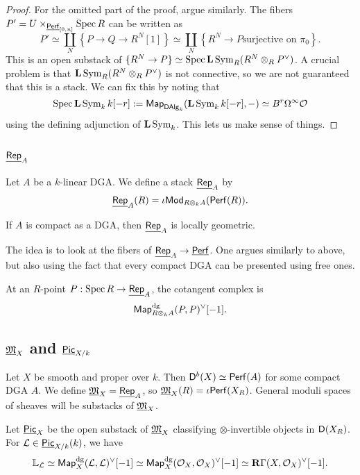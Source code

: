 \documentclass{amsart}
\begin{document}
\begin{proof}
	For the omitted part of the proof, argue similarly.
	The fibers $P' = U \times_{\underline{\mathsf{Perf}}_{[0,n]}} \operatorname{Spec} R$ can be written as
	\[
		P' \simeq \coprod_N \left\{ P \to Q \to R^N[1] \right\} \simeq \coprod_N \left\{ R^N \to P \textrm{surjective on $\pi_0$}\right\}.
	\]
	This is an open substack of $\{ R^N \to P \} \simeq \operatorname{Spec} \mathbf{L} \operatorname{Sym}_R (R^N \otimes_R P^\vee)$.
	A crucial problem is that $\mathbf{L} \operatorname{Sym}_R (R^N \otimes_R P^\vee)$ is not connective, so we are not guaranteed that this is a stack.
	We can fix this by noting that
	\[
		\operatorname{Spec} \mathbf{L} \operatorname{Sym}_k k[-r] := \mathsf{Map}_{\mathsf{DAlg}_k}(\mathbf{L} \operatorname{Sym}_k k[-r], -) \simeq B^r \Omega^\infty \mathcal{O}
	\]
	using the defining adjunction of $\mathbf{L} \operatorname{Sym}_k$.
	This lets us make sense of things.
\end{proof}

\subsection{$\underline{\mathsf{Rep}}_A$}

Let $A$ be a $k$-linear DGA.
We define a stack $\underline{\mathsf{Rep}}_A$ by
\[
	\underline{\mathsf{Rep}}_A(R) = \iota \mathsf{Mod}_{R \otimes_k A}(\mathsf{Perf}(R)).
\]

\begin{thm}[To\"en-Vaqui\'e]
	If $A$ is compact as a DGA, then $\underline{\mathsf{Rep}}_A$ is locally geometric.
\end{thm}

The idea is to look at the fibers of $\underline{\mathsf{Rep}}_A \to \underline{\mathsf{Perf}}$.
One argues similarly to above, but also using the fact that every compact DGA can be presented using free ones.

\begin{lem}
	At an $R$-point $P: \operatorname{Spec} R \to \underline{\mathsf{Rep}}_A$, the cotangent complex is
	\[
		\mathsf{Map}_{R \otimes_k A}^{\textrm{dg}}(P, P)^\vee[-1].
	\]
\end{lem}

\subsection{$\underline{\mathfrak{M}}_X$ and $\underline{\mathsf{Pic}}_{X/k}$}

Let $X$ be smooth and proper over $k$.
Then $\mathsf{D}^b(X) \simeq \mathsf{Perf}(A)$ for some compact DGA $A$.
We define $\underline{\mathfrak{M}}_X = \underline{\mathsf{Rep}}_A$, so $\underline{\mathfrak{M}}_X(R) = \iota \mathsf{Perf}(X_R)$.
General moduli spaces of sheaves will be substacks of $\underline{\mathfrak{M}}_X$.

Let $\underline{\mathsf{Pic}}_X$ be the open substack of $\underline{\mathfrak{M}}_X$ classifying $\otimes$-invertible objects in $\mathsf{D}(X_R)$.
For $\mathcal{L} \in \underline{\mathsf{Pic}}_{X/k}(k)$, we have
\[
	\mathbb{L}_{\mathcal{L}} \simeq \mathsf{Map}_X^{\textrm{dg}}(\mathcal{L}, \mathcal{L})^\vee[-1] \simeq \mathsf{Map}_X^{\textrm{dg}}(\mathcal{O}_X, \mathcal{O}_X)^\vee[-1] \simeq \mathbf{R} \Gamma(X, \mathcal{O}_X)^\vee[-1].
\]
\end{document}
